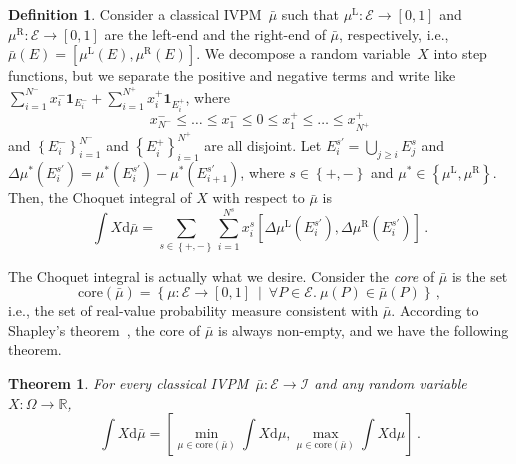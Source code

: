 \documentclass[english,reprint, aps, prl,superscriptaddress, showpacs,
showkeys, longbibliography, amsmath, amssymb]{revtex4-1}
\theoremstyle{plain}
\newtheorem{thm}{Theorem}
\theoremstyle{definition}
\newtheorem{definition}{Definition}
\newcommand{\events}{\ensuremath{\mathcal{E}}}
\newcommand{\pmeas}{\ensuremath{\mu}}
\newcommand{\set}[2]{\ensuremath{\left\{ {#1}~\middle|~{#2}\right\} }}
\newcommand{\mul}[1][]{\ensuremath{\mu^{\mathrm{L{#1}}}}}
\newcommand{\mur}[1][]{\ensuremath{\mu^{\mathrm{R{#1}}}}}
\newcommand{\nb}{\nolinebreak[1] }
\newcommand{\rmd}{\mathrm{d}}
\begin{document}
\begin{definition}\label{def:Choquet}Consider a classical IVPM~$\bar{\mu}$
such that $\mul:\events\rightarrow\left[0,1\right]$ and $\mur:\events\rightarrow\left[0,1\right]$
are the left-end and the right-end of $\bar{\mu}$, respectively,
i.e., $\bar{\mu}\left(E\right)=\left[\mul\left(E\right),\mur\left(E\right)\right]$.
We decompose a random variable~$X$ into step functions, but we separate
the positive and negative terms and write like $\sum_{i=1}^{N^{-}}x_{i}^{-}\mathbf{1}_{E_{i}^{-}}+\sum_{i=1}^{N^{+}}x_{i}^{+}\mathbf{1}_{E_{i}^{+}}$,
where 
\begin{equation}
x_{N^{-}}^{-}\le\ldots\le x_{1}^{-}\le0\le x_{1}^{+}\le\ldots\le x_{N^{+}}^{+}
\end{equation}
 and $\left\{ E_{i}^{-}\right\} _{i=1}^{N^{-}}$ and $\left\{ E_{i}^{+}\right\} _{i=1}^{N^{+}}$
are all disjoint. Let $E_{i}^{s\prime}=\bigcup_{j\ge i}E_{j}^{s}$
and $\Delta\mu^{*}\left(E_{i}^{s\prime}\right)=\mu^{*}\left(E_{i}^{s\prime}\right)-\mu^{*}\left(E_{i+1}^{s\prime}\right)$,
where $s\in\left\{ +,-\right\} $ and $\mu^{*}\in\left\{ \mul,\mur\right\} $.
Then, the Choquet integral of $X$ with respect to $\bar{\mu}$ is
\begin{equation}
\int X\rmd\bar{\mu}=\sum_{s\in\left\{ +,-\right\} }\sum_{i=1}^{N^{s}}x_{i}^{s}\left[\Delta\mul\left(E_{i}^{s\prime}\right),\Delta\mur\left(E_{i}^{s\prime}\right)\right]\,.\label{eq:interval-expectation}
\end{equation}
\end{definition}

The Choquet integral is actually what we desire. Consider the \emph{core}
of $\bar{\mu}$ is the set 
\begin{equation}
\mathrm{core}\left(\bar{\mu}\right)=\set{\pmeas:\events\rightarrow[0,1]}{\forall P\in\events.~\pmeas\left(P\right)\in\bar{\mu}\left(P\right)}\,,
\end{equation}
i.e., the set of real-value probability measure consistent with $\bar{\mu}$.
According to Shapley's theorem~\citep{Shapley1971,GilboaSchmeidler1994,Grabisch2016},
the core of $\bar{\mu}$ is always non-empty, and we have the following
theorem\nb\citep{Rosenmuller1971,GilboaSchmeidler1994,Grabisch2016}.

\begin{thm}\label{thm:Rosenmuller}For every classical IVPM~$\bar{\mu}:\events\rightarrow\mathscr{I}$
and any random variable~$X:\Omega\rightarrow\mathbb{R}$, 
\begin{equation}
\int X\rmd\bar{\mu}=\left[\min_{\mu\in\mathrm{core}\left(\bar{\mu}\right)}\int X\rmd\mu,\max_{\mu\in\mathrm{core}\left(\bar{\mu}\right)}\int X\rmd\mu\right]\,.
\end{equation}
\end{thm}
\end{document}
